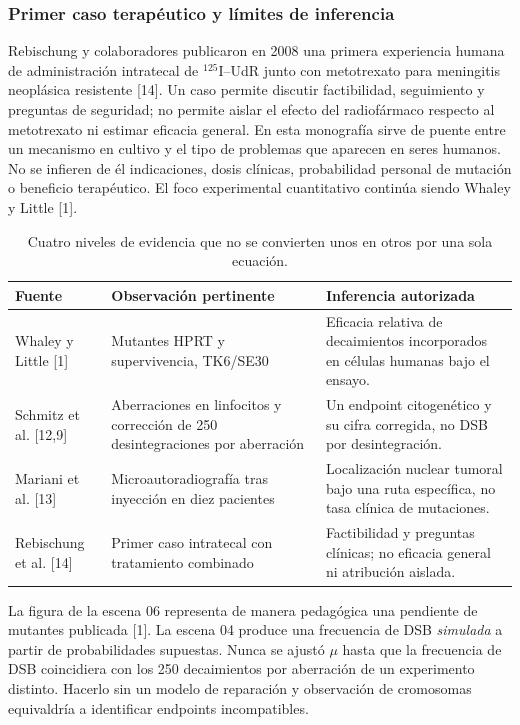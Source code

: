 \subsubsection{Primer caso terapéutico y límites de inferencia}
Rebischung y colaboradores publicaron en 2008 una primera experiencia
humana de administración intratecal de $^{125}$I--UdR junto con
metotrexato para meningitis neoplásica resistente [14]. Un caso permite
discutir factibilidad, seguimiento y preguntas de seguridad; no permite
aislar el efecto del radiofármaco respecto al metotrexato ni estimar
eficacia general. En esta monografía sirve de puente entre un mecanismo
en cultivo y el tipo de problemas que aparecen en seres humanos. No se
infieren de él indicaciones, dosis clínicas, probabilidad personal de
mutación o beneficio terapéutico. El foco experimental cuantitativo
continúa siendo Whaley y Little [1].

\begin{table}[htbp]\centering\small
\begin{tabularx}{\linewidth}{@{}p{.19\linewidth}p{.31\linewidth}X@{}}
\toprule Fuente & Observación pertinente & Inferencia autorizada \\\midrule
Whaley y Little [1] & Mutantes HPRT y supervivencia, TK6/SE30 & Eficacia relativa de decaimientos incorporados en células humanas bajo el ensayo. \\
Schmitz et al. [12,9] & Aberraciones en linfocitos y corrección de 250 desintegraciones por aberración & Un endpoint citogenético y su cifra corregida, no DSB por desintegración. \\
Mariani et al. [13] & Microautoradiografía tras inyección en diez pacientes & Localización nuclear tumoral bajo una ruta específica, no tasa clínica de mutaciones. \\
Rebischung et al. [14] & Primer caso intratecal con tratamiento combinado & Factibilidad y preguntas clínicas; no eficacia general ni atribución aislada. \\\bottomrule
\end{tabularx}
\caption{Cuatro niveles de evidencia que no se convierten unos en otros por una sola ecuación.}
\end{table}

La figura de la escena 06 representa de manera pedagógica una pendiente de
mutantes publicada [1]. La escena 04 produce una frecuencia de DSB
\emph{simulada} a partir de probabilidades supuestas. Nunca se ajustó
$\mu$ hasta que la frecuencia de DSB coincidiera con los 250 decaimientos
por aberración de un experimento distinto. Hacerlo sin un modelo de
reparación y observación de cromosomas equivaldría a identificar endpoints
incompatibles.

